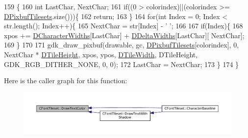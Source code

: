 \begin{DoxyCode}
159                                                                                                            
                       \{
160     \textcolor{keywordtype}{int} LastChar, NextChar;
161     \textcolor{keywordflow}{if}((0 > colorindex)||(colorindex >= \hyperlink{classCFontTileset_ae6e92dd613809fb15892b51e0e6b4940}{DPixbufTilesets}.size()))\{
162         \textcolor{keywordflow}{return};    
163     \}
164     \textcolor{keywordflow}{for}(\textcolor{keywordtype}{int} Index = 0; Index < str.length(); Index++)\{
165         NextChar = str[Index] - \textcolor{charliteral}{' '};
166         
167         \textcolor{keywordflow}{if}(Index)\{
168             xpos += \hyperlink{classCFontTileset_ad25347b5350a8380be8c550d9f2e2798}{DCharacterWidths}[LastChar] + \hyperlink{classCFontTileset_a1e253853e14282e9582a7f47dace8f70}{DDeltaWidths}[LastChar][
      NextChar]; 
169         \}
170         
171         gdk\_draw\_pixbuf(drawable, gc, \hyperlink{classCFontTileset_ae6e92dd613809fb15892b51e0e6b4940}{DPixbufTilesets}[colorindex], 0, NextChar * 
      \hyperlink{classCGraphicTileset_af48f32e07d5fe69afd5f764318cc3244}{DTileHeight}, xpos, ypos, \hyperlink{classCGraphicTileset_a2d0c7d19865b81911a3a43d5cae50e00}{DTileWidth}, DTileHeight, GDK\_RGB\_DITHER\_NONE, 0, 0);
172         LastChar = NextChar;
173     \}
174 \}
\end{DoxyCode}
Here is the caller graph for this function\+:
\nopagebreak
\begin{figure}[H]
\begin{center}
\leavevmode
\includegraphics[width=350pt]{classCFontTileset_a987f13f64865891b7bf8b10f0b519fb7_icgraph}
\end{center}
\end{figure}
\hypertarget{classCFontTileset_a6716e51a5692130847914287a5f1b734}{}\label{classCFontTileset_a6716e51a5692130847914287a5f1b734} 
